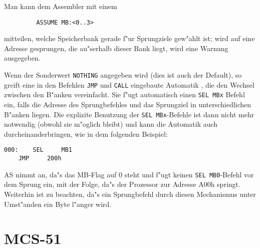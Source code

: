 \documentclass[12pt,a4paper,twoside]{report}
\newcommand{\tty}[1]{{\tt #1}}
\begin{document}
Man kann dem Assembler mit einem
\begin{verbatim}
         ASSUME MB:<0..3>
\end{verbatim}
mitteilen, welche Speicherbank gerade f"ur Sprungziele gew"ahlt ist; wird auf
eine Adresse gesprungen, die au"serhalb dieser Bank liegt, wird eine Warnung
ausgegeben.

Wenn der Sonderwert {\tt NOTHING} angegeben wird (dies ist auch der Default), 
so greift eine in den Befehlen \tty{JMP} und \tty{CALL} eingebaute Automatik ,
die den Wechsel zwischen den B"anken vereinfacht.  Sie f"ugt automatisch einen
{\tt SEL MBx} Befehl ein, falls die Adresse des Sprungbefehles und das
Sprungziel in unterschiedlichen B"anken liegen.  Die explizite Benutzung der
\tty{SEL MBx}-Befehle ist dann nicht mehr notwendig (obwohl sie m"oglich
bleibt) und kann die Automatik auch durcheinanderbringen, wie in dem folgenden
Beispiel:
\begin{verbatim}
000:    SEL     MB1
	JMP     200h
\end{verbatim}
AS nimmt an, da"s das MB-Flag auf 0 steht und f"ugt keinen
\tty{SEL MB0}-Befehl vor dem Sprung ein, mit der Folge, da"s der
Prozessor zur Adresse A00h springt.
Weiterhin ist zu beachten, da"s ein Sprungbefehl durch diesen Mechanismus
unter Umst"anden ein Byte l"anger wird.


\section{MCS-51}
\end{document}
